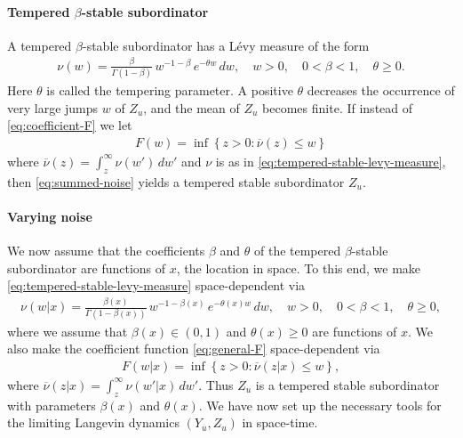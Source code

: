 \documentclass[a4paper,12pt]{elsarticle}
\numberwithin{equation}{section}
\theoremstyle{plain}
\theoremstyle{definition}
\theoremstyle{remark}
\numberwithin{equation}{section}
\newcommand{\1}{\mathbf 1}
\begin{document}
\paragraph{Tempered $\beta$-stable subordinator}
A tempered $\beta$-stable subordinator has a L\'evy measure of the form
\begin{align}
  \label{eq:tempered-stable-levy-measure}
  \nu(w) = \frac{\beta}{\Gamma(1-\beta)}\, w^{-1-\beta}\,e^{-\theta w}\,dw, 
  \quad w > 0, \quad 0 < \beta < 1, \quad \theta \ge 0. 
\end{align}
Here $\theta$ is called the tempering parameter. A positive $\theta$ decreases 
the occurrence of very large jumps $w$ of $Z_u$, and the mean of $Z_u$ becomes 
finite.  If instead of \eqref{eq:coefficient-F} we let 
\begin{align} \label{eq:general-F}
  F(w) = \inf\left\lbrace z > 0: \overline \nu(z) \le w \right\rbrace
\end{align}
where $\overline \nu(z) = \int_z^\infty \nu(w')\,dw'$ and $\nu$ is as in \eqref{eq:tempered-stable-levy-measure}, then 
\eqref{eq:summed-noise}
yields a tempered stable subordinator $Z_u$.

\paragraph{Varying noise}
We now assume that the coefficients $\beta$ and $\theta$ of the tempered 
$\beta$-stable subordinator are functions of $x$, the location in space. 
To this end, we make 
\eqref{eq:tempered-stable-levy-measure} space-dependent via
\begin{align}
  \label{eq:varying-tempered-stable-levy-measure}
  \nu(w | x) = \frac{\beta(x)}{\Gamma(1-\beta(x))}\, 
  w^{-1-\beta(x)}\,e^{-\theta(x) w}\,dw, 
  \quad w > 0, \quad 0 < \beta < 1, \quad \theta \ge 0, 
\end{align}
where we assume that $\beta(x) \in (0,1)$ and $\theta(x) \ge 0$ are  
functions of $x$.
We also make the coefficient function \eqref{eq:general-F} space-dependent via
\begin{align} \label{eq:varying-general-F}
  F(w|x) = \inf\left\lbrace z > 0: \overline \nu(z | x) \le w 
  \right\rbrace,
\end{align}
where $\overline \nu(z | x) = \int_z^\infty \nu(w'|x)\,dw'$.
Thus $Z_u$ is a tempered stable subordinator with parameters $\beta(x)$ and 
$\theta(x)$. 
We have now set up the necessary tools for the limiting Langevin 
dynamics $(Y_u, Z_u)$ in space-time.
\end{document}
